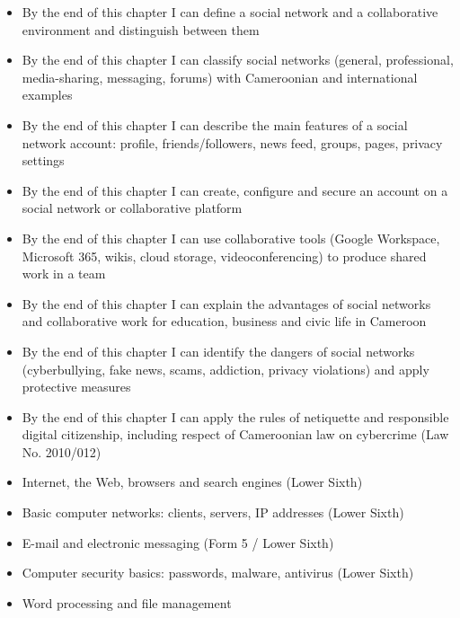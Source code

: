 \documentclass[11pt]{article}
\begin{document}
\begin{objectifs}
\begin{itemize}
\item By the end of this chapter I can define a social network and a collaborative environment and distinguish between them
\item By the end of this chapter I can classify social networks (general, professional, media-sharing, messaging, forums) with Cameroonian and international examples
\item By the end of this chapter I can describe the main features of a social network account: profile, friends/followers, news feed, groups, pages, privacy settings
\item By the end of this chapter I can create, configure and secure an account on a social network or collaborative platform
\item By the end of this chapter I can use collaborative tools (Google Workspace, Microsoft 365, wikis, cloud storage, videoconferencing) to produce shared work in a team
\item By the end of this chapter I can explain the advantages of social networks and collaborative work for education, business and civic life in Cameroon
\item By the end of this chapter I can identify the dangers of social networks (cyberbullying, fake news, scams, addiction, privacy violations) and apply protective measures
\item By the end of this chapter I can apply the rules of netiquette and responsible digital citizenship, including respect of Cameroonian law on cybercrime (Law No. 2010/012)
\end{itemize}
\end{objectifs}

\begin{prerequis}
\begin{itemize}
\item Internet, the Web, browsers and search engines (Lower Sixth)
\item Basic computer networks: clients, servers, IP addresses (Lower Sixth)
\item E-mail and electronic messaging (Form 5 / Lower Sixth)
\item Computer security basics: passwords, malware, antivirus (Lower Sixth)
\item Word processing and file management
\end{itemize}
\end{prerequis}
\end{document}
